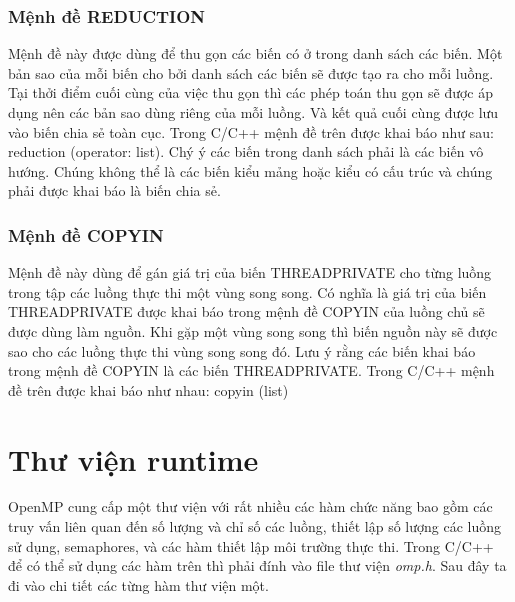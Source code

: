 \documentclass{report}
\begin{document}
\subsubsection{Mệnh đề REDUCTION}
Mệnh đề này được dùng để thu gọn các biến có ở trong danh sách các biến.
Một bản sao của mỗi biến cho bởi danh sách các biến sẽ được tạo ra cho mỗi luồng.
Tại thởi điểm cuối cùng của việc thu gọn thì các phép toán thu gọn sẽ được áp dụng
nên các bản sao dùng riêng của mỗi luồng. Và kết quả cuối cùng được lưu vào biến
chia sẻ toàn cục. Trong C/C++ mệnh đề trên được khai báo như sau:
\textsf{reduction (operator: list)}.
Chý ý các biến trong danh sách phải là các biến vô hướng. Chúng không thể là
các biến kiểu mảng hoặc kiểu có cấu trúc và chúng phải được khai báo là biến chia sẻ.

\subsubsection{Mệnh đề COPYIN}
Mệnh đề này dùng để gán giá trị của biến \textsf{THREADPRIVATE} cho từng luồng
trong tập các luồng thực thi một vùng song song. Có nghĩa là giá trị của biến
\textsf{THREADPRIVATE} được khai báo trong mệnh đề \textsf{COPYIN} của luồng chủ sẽ được
dùng làm nguồn. Khi gặp một vùng song song thì biến nguồn này sẽ được sao cho các
luồng thực thi vùng song song đó. Lưu ý rằng các biến khai báo trong mệnh đề
\textsf{COPYIN} là các biến \textsf{THREADPRIVATE}. Trong C/C++ mệnh đề trên được khai báo
như nhau:
\textsf{copyin (list)}

\section{Thư viện runtime}
OpenMP cung cấp một thư viện với rất nhiều các hàm chức năng bao gồm các
truy vấn liên quan đến số lượng và chỉ số các luồng, thiết lập số lượng các luồng sử
dụng, semaphores, và các hàm thiết lập môi trường thực thi. Trong C/C++ để có thể sử
dụng các hàm trên thì phải đính vào file thư viện \emph{omp.h}. Sau đây ta đi vào chi tiết các từng hàm thư viện một.
\end{document}
